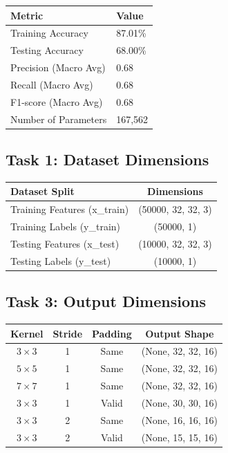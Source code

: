 \documentclass[11pt]{article}
\begin{document}
\vspace{5mm}
\begin{center}
\renewcommand{\arraystretch}{1.3}
\begin{tabular}{|p{5cm}|p{4cm}|}
\hline
\textbf{Metric} & \textbf{Value} \\
\hline
Training Accuracy & 87.01\% \\
\hline
Testing Accuracy & 68.00\% \\
\hline
Precision (Macro Avg) & 0.68 \\
\hline
Recall (Macro Avg) & 0.68 \\
\hline
F1-score (Macro Avg) & 0.68 \\
\hline
Number of Parameters & 167,562 \\
\hline
\end{tabular}
\end{center}

\subsection*{Task 1: Dataset Dimensions}

\begin{center}
\renewcommand{\arraystretch}{1.3}
\begin{tabular}{|l|c|}
\hline
\textbf{Dataset Split} & \textbf{Dimensions} \\
\hline
Training Features (x\_train) & (50000, 32, 32, 3) \\
\hline
Training Labels (y\_train) & (50000, 1) \\
\hline
Testing Features (x\_test) & (10000, 32, 32, 3) \\
\hline
Testing Labels (y\_test) & (10000, 1) \\
\hline
\end{tabular}
\end{center}

\subsection*{Task 3: Output Dimensions}

\begin{center}
\renewcommand{\arraystretch}{1.3}
\begin{tabular}{|c|c|c|c|}
\hline
\textbf{Kernel} & \textbf{Stride} & \textbf{Padding} & \textbf{Output Shape} \\
\hline
$3\times3$ & 1 & Same & (None, 32, 32, 16) \\
\hline
$5\times5$ & 1 & Same & (None, 32, 32, 16) \\
\hline
$7\times7$ & 1 & Same & (None, 32, 32, 16) \\
\hline
$3\times3$ & 1 & Valid & (None, 30, 30, 16) \\
\hline
$3\times3$ & 2 & Same & (None, 16, 16, 16) \\
\hline
$3\times3$ & 2 & Valid & (None, 15, 15, 16) \\
\hline
\end{tabular}
\end{center}
\end{document}
